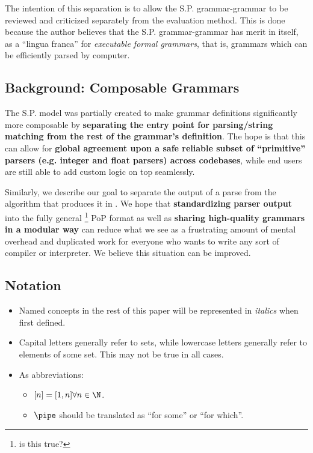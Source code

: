\documentclass[10pt]{article}
\begin{document}
The intention of this separation is to allow the S.P. grammar-grammar to be reviewed and criticized separately from the evaluation method. This is done because the author believes that the S.P. grammar-grammar has merit in itself, as a ``lingua franca'' for \textit{executable formal grammars}, that is, grammars which can be efficiently parsed by computer.

\subsection{Background: Composable Grammars}
\label{sec:background-composable-grammars}
The S.P. model was partially created to make grammar definitions significantly more composable by \textbf{separating the entry point for parsing/string matching from the rest of the grammar's definition}. The hope is that this can allow for \textbf{global agreement upon a safe reliable subset of ``primitive'' parsers (e.g. integer and float parsers) across codebases}, while end users are still able to add custom logic on top seamlessly.

Similarly, we describe our goal to separate the output of a parse from the algorithm that produces it in . We hope that \textbf{standardizing parser output} into the fully general \footnote{is this true?} PoP format as well as \textbf{sharing high-quality grammars in a modular way} can reduce what we see as a frustrating amount of mental overhead and duplicated work for everyone who wants to write any sort of compiler or interpreter. We believe this situation can be improved.

\subsection{Notation}
\label{sec:notation}
\begin{itemize}
  \item Named concepts in the rest of this paper will be represented in \textit{italics} when first defined.
  \item Capital letters generally refer to sets, while lowercase letters generally refer to elements of some set. This may not be true in all cases.
  \item As abbreviations: \begin{itemize}
    \item $[n] = [1, n] \forall n \in \N$.
    \item $\pipe$ should be translated as ``for some'' or ``for which''.
  \end{itemize}
\end{itemize}
\end{document}
